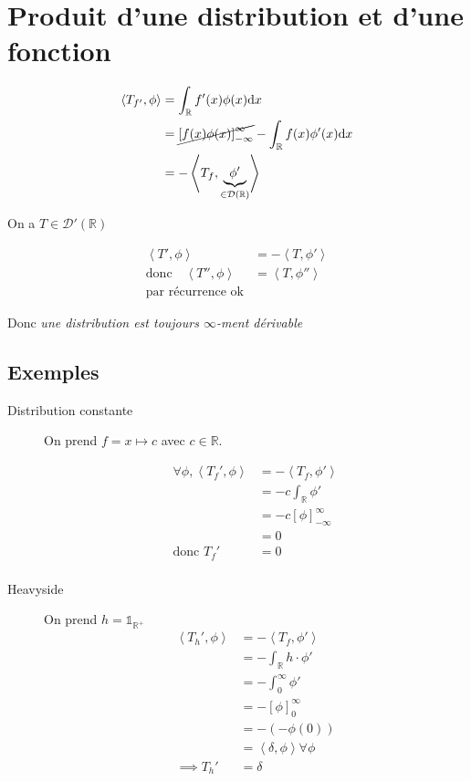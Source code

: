 \documentclass{article}
\newcommand{\R}{\mathbb{R}}
\newcommand{\dx}{\mathrm{d}x}
\begin{document}
	\section{Produit d'une distribution et d'une fonction}

	\begin{align*}
		\left<T_{f'}, \phi \right> &= \int_\R f'(x) \phi(x) \dx \\
					   &= \cancel{\left[ f(x) \phi(x) \right]_{-\infty}^\infty} - \int_\R f(x) \phi'(x) \dx \\
					   &= -\left<T_f, \underbrace{\phi'}_{\in \mathcal{D}(\R)} \right>\\
	\end{align*}

	On a $T \in \mathcal{D}'(\R)$

	\begin{align*}
		\left<T', \phi \right> &=  -\left<T, \phi' \right> \\
		\text{donc}\quad \left<T'', \phi \right> &= \left<T, \phi'' \right> \\
		\text{par récurrence ok}
	\end{align*}

	Donc \emph{une distribution est toujours $\infty$-ment dérivable} 

	\subsection{Exemples}
	\begin{description}
		\item[Distribution constante] 
			On prend $f = x\mapsto c$ avec $c \in \R$.

			\begin{align*}
				\forall \phi, \left<T_f', \phi \right> &= -\left<T_f, \phi' \right> \\
				&= -c \int_\R \phi' \\
				&= -c [\phi]_{-\infty}^\infty \\
				&= 0 \\
			\text{donc } T_f' &= 0 \\
			\end{align*}
		\item[Heavyside] 
			On prend $h = \mathbb{1}_{\R^+}$
			\begin{align*}
				\left<T_h', \phi \right> &=  - \left<T_f, \phi' \right>\\
				&= -\int_{\R} h \cdot \phi' \\
				&= -\int_0^\infty \phi' \\
				&= -[\phi]_0^\infty \\
				&=  -(-\phi(0))\\
				&= \left<\delta, \phi \right> \forall \phi \\
			\implies T_h' &= \delta \\
			\end{align*}
	\end{description}
\end{document}
